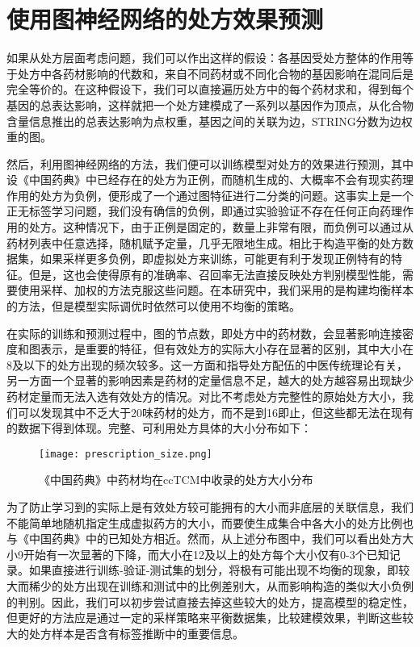 \section{使用图神经网络的处方效果预测}

如果从处方层面考虑问题，我们可以作出这样的假设：各基因受处方整体的作用等于处方中各药材影响的代数和，来自不同药材或不同化合物的基因影响在混同后是完全等价的。在这种假设下，我们可以直接遍历处方中的每个药材求和，得到每个基因的总表达影响，这样就把一个处方建模成了一系列以基因作为顶点，从化合物含量信息推出的总表达影响为点权重，基因之间的关联为边，STRING分数为边权重的图。

然后，利用图神经网络的方法，我们便可以训练模型对处方的效果进行预测，其中设《中国药典》中已经存在的处方为正例，而随机生成的、大概率不会有现实药理作用的处方为负例，便形成了一个通过图特征进行二分类的问题。这事实上是一个正无标签学习问题，我们没有确信的负例，即通过实验验证不存在任何正向药理作用的处方。这种情况下，由于正例是固定的，数量上非常有限，而负例可以通过从药材列表中任意选择，随机赋予定量，几乎无限地生成。相比于构造平衡的处方数据集，如果采样更多负例，即虚拟处方来训练，可能更有利于发现正例特有的特征。但是，这也会使得原有的准确率、召回率无法直接反映处方判别模型性能，需要使用采样、加权的方法克服这些问题。在本研究中，我们采用的是构建均衡样本的方法，但是模型实际调优时依然可以使用不均衡的策略。

在实际的训练和预测过程中，图的节点数，即处方中的药材数，会显著影响连接密度和图表示，是重要的特征，但有效处方的实际大小存在显著的区别，其中大小在8及以下的处方出现的频次较多。这一方面和指导处方配伍的中医传统理论有关，另一方面一个显著的影响因素是药材的定量信息不足，越大的处方越容易出现缺少药材定量而无法入选有效处方的情况。对比不考虑处方完整性的原始处方大小，我们可以发现其中不乏大于20味药材的处方，而不是到16即止，但这些都无法在现有的数据下得到体现。完整、可利用处方具体的大小分布如下：


\begin{figure}[H]
  \centering
  \texttt{[image: prescription\_size.png]}
  \caption{《中国药典》中药材均在ccTCM中收录的处方大小分布}
  \label{fig:prescription_size}
\end{figure}

为了防止学习到的实际上是有效处方较可能拥有的大小而非底层的关联信息，我们不能简单地随机指定生成虚拟药方的大小，而要使生成集合中各大小的处方比例也与《中国药典》中的已知处方相近。然而，从上述分布图中，我们可以看出处方大小9开始有一次显著的下降，而大小在12及以上的处方每个大小仅有0-3个已知记录。如果直接进行训练-验证-测试集的划分，将极有可能出现不均衡的现象，即较大而稀少的处方出现在训练和测试中的比例差别大，从而影响构造的类似大小负例的判别。因此，我们可以初步尝试直接去掉这些较大的处方，提高模型的稳定性，但更好的方法应是通过一定的采样策略来平衡数据集，比较建模效果，判断这些较大的处方样本是否含有标签推断中的重要信息。

